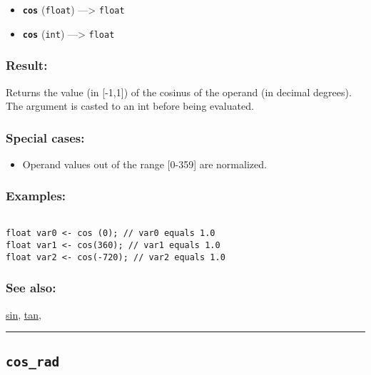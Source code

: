 \documentclass[]{book}
\providecommand{\tightlist}{%
  \setlength{\itemsep}{0pt}\setlength{\parskip}{0pt}}
\theoremstyle{definition}
\theoremstyle{definition}
\theoremstyle{definition}
\theoremstyle{remark}
\begin{document}
\begin{itemize}
\tightlist
\item
  \textbf{\texttt{cos}} (\texttt{float}) ---\textgreater{}
  \texttt{float}
\item
  \textbf{\texttt{cos}} (\texttt{int}) ---\textgreater{} \texttt{float}
\end{itemize}

\subsubsection{Result:}\label{result-107}

Returns the value (in {[}-1,1{]}) of the cosinus of the operand (in
decimal degrees). The argument is casted to an int before being
evaluated.

\subsubsection{Special cases:}\label{special-cases-39}

\begin{itemize}
\tightlist
\item
  Operand values out of the range {[}0-359{]} are normalized.
\end{itemize}

\subsubsection{Examples:}\label{examples-84}

\begin{verbatim}
 
float var0 <- cos (0); // var0 equals 1.0 
float var1 <- cos(360); // var1 equals 1.0 
float var2 <- cos(-720); // var2 equals 1.0
\end{verbatim}

\subsubsection{See also:}\label{see-also-67}

\href{OperatorsSZ\#sin}{sin}, \href{OperatorsSZ\#tan}{tan},

\begin{center}\rule{0.5\linewidth}{\linethickness}\end{center}

\subsection{\texorpdfstring{\texttt{cos\_rad}}{cos\_rad}}\label{cos_rad}
\end{document}
